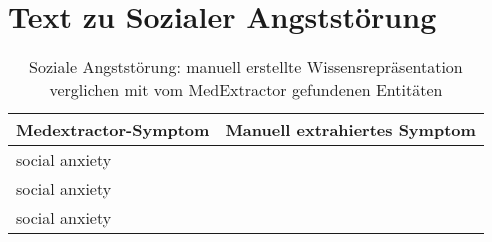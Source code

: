 \section{Text zu Sozialer Angststörung}
\label{sec:socialanxiety} 

\begin{table}[H]
\begin{center}
\begin{tabular}{ll}
\toprule
  Medextractor-Symptom &                       Manuell extrahiertes Symptom \\
\midrule
     social anxiety &                  \\
      social anxiety &                  \\
      social anxiety &                  \\
\bottomrule
\end{tabular}
\caption{Soziale Angststörung: manuell erstellte Wissensrepräsentation verglichen mit vom MedExtractor gefundenen Entitäten}
\label{tab:socialanxiety_vergleich_manuell_medextractor}
\end{center}
\end{table}


